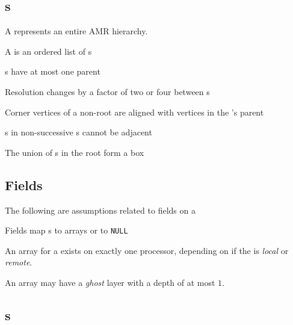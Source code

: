 \documentclass[11pt]{article}
\begin{document}
\subsection{s} \label{ss:hierarchy}

A  represents an entire AMR hierarchy.

\BeginENUMERATE
\item A  is an ordered list of s
\item {}s have at most one parent
\item Resolution changes by a factor of two or four between  s
\item Corner vertices of a non-root  are aligned with vertices in the 's parent
\item {}s in non-successive s cannot be adjacent
\item The union of s in the root  form a box
\EndENUMERATE

\subsection{Fields} \label{ss:field}

The following are assumptions related to fields on a 

\BeginENUMERATE
\item Fields map s to arrays or to \texttt{NULL}
\item An array for a  exists on exactly one processor, depending
  on if the  is \textit{local} or \textit{remote}.
\item An array may have a \textit{ghost} layer with a depth of at most $1$.
\EndENUMERATE

\subsection{s} \label{ss:vector}
\end{document}

